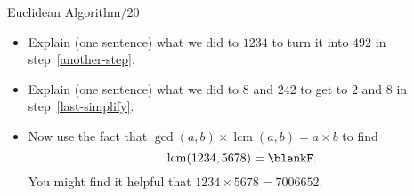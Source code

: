 \documentclass[12pt,letterpaper]{article}
\begin{document}
\begin{problem}{Euclidean Algorithm\hfill/20}
\begin{itemize}
    \vspace{1.5em}

    \item Explain (one sentence) what we did to \(1234\) to turn it into \(492\) in
    step~\ref{another-step}.

    \vspace{1.5em}

    \item Explain (one sentence) what we did to \(8\) and \(242\) to get to \(2\) and \(8\)
    in step~\ref{last-simplify}.

    \vspace{1.5em}

    \item Now use the fact that \(\gcd(a, b) \times \operatorname{lcm}(a, b) = a \times b\)
    to find \[ \operatorname{lcm}(1234, 5678) = \blankF. \] You might find it helpful that
    \(1234 \times 5678 = 7006652\).
 \end{itemize}
\end{problem}
\end{document}
